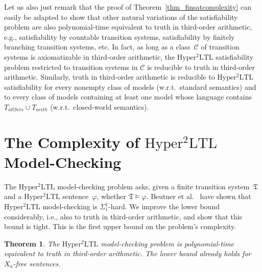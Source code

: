 \documentclass[dvipsnames,10pt,a4paper]{amsart}
\newtheorem{thm}{Theorem}[section]
\theoremstyle{definition}
\theoremstyle{remark}
\renewcommand{\phi}{\varphi}
\newcommand{\sohyltl}{\mathrm{Hyper^2LTL}\xspace}
\newcommand{\univar}{X_a}
\newcommand{\tsys}{\mathfrak{T}}
\newcommand{\allsets}{{\mathit{allSets}}}
\newcommand{\arith}{\mathit{arith}}
\newcommand{\class}{\mathcal{C}}
\begin{document}
Let us also just remark that the proof of Theorem~\ref{thm_finsatcomplexity} can easily be adapted to show that other natural variations of the satisfiability problem are also polynomial-time equivalent to  truth in third-order arithmetic, e.g., satisfiability by countable transition systems, satisfiability by finitely branching transition systems, etc.
In fact, as long as a class~$\class$ of transition systems is axiomatizable in third-order arithmetic, the $\sohyltl$ satisfiability problem restricted to transition systems in $\class$ is reducible to truth in third-order arithmetic.
Similarly, truth in third-order arithmetic is reducible to $\sohyltl$ satisfiability for every nonempty class of models (w.r.t.\ standard semantics) and to every class of models containing at least one model whose language contains $T_\allsets \cup T_\arith$ (w.r.t.\ closed-world semantics).

\section{\texorpdfstring{The Complexity of $\sohyltl$ Model-Checking}{The Complexity of Second-order HyperLTL Model-Checking}}
\label{sec_mc}

The $\sohyltl$ model-checking problem asks, given a finite transition system~$\tsys$ and a $\sohyltl$ sentence~$\phi$, whether $\tsys \models \phi$.
Beutner et al.~\cite{DBLP:conf/cav/BeutnerFFM23} have shown that $\sohyltl$ model-checking is $\Sigma_1^1$-hard. 
We improve the lower bound considerably, i.e., also to truth in third-order arithmetic, and show that this bound is tight.
This is the first upper bound on the problem's complexity. 

\begin{thm}
\label{thm_mccomplexity}
The $\sohyltl$ model-checking problem is polynomial-time equivalent to truth in third-order arithmetic. The lower bound already holds for $\univar$-free sentences.
\end{thm}
\end{document}
